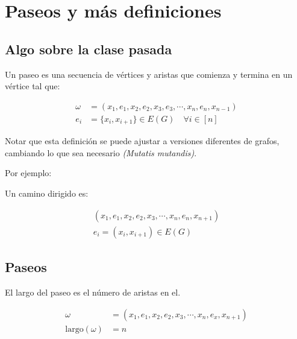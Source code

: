 \documentclass[../main.tex]{subfiles}
\begin{document}
\chapter{Paseos y más definiciones}%

\thispagestyle{fancy}

\section{Algo sobre la clase pasada}%
\label{sec:algo_sobre_la_clase_pasada}

Un paseo es una secuencia de vértices y aristas que comienza y termina en un
vértice tal que:

\begin{align*}
	\omega &=
	(
		x_1,e_1,
		x_2,e_2,
		x_3,e_3,
		\cdots,
		x_n,e_n,x_{n-1}
	)\\
	e_i &= \{x_i,x_{i+1}\}\in E(G)\quad \forall i\in[n]
\end{align*}

Notar que esta definición se puede ajustar a versiones diferentes de grafos,
cambiando lo que sea necesario \emph{(Mutatis mutandis)}.

Por ejemplo:

Un camino dirigido es:

\begin{align*}
	(
		x_1,e_1,
		x_2,e_2,
		x_3,\cdots,
		x_n,e_n,x_{n+1}
	)\\
	e_i = (x_i, x_{i+1})\in E(G)
\end{align*}


\section{Paseos}%
\label{sec:paseos}

El largo del paseo es el número de aristas en el.

\begin{align*}
	\omega &=
	(
		x_1,e_1,
		x_2,e_2,
		x_3,\cdots,
		x_n,e_x,x_{n+1}
	)\\
	\text{largo}(\omega) &= n
\end{align*}
\end{document}
